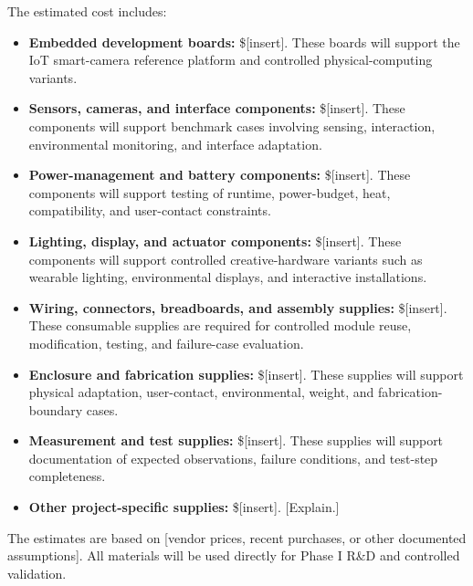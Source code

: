 \documentclass[11pt,letterpaper]{article}
\begin{document}
The estimated cost includes:

\begin{itemize}
    \item \textbf{Embedded development boards:} \$[insert].
    These boards will support the IoT smart-camera reference platform and
    controlled physical-computing variants.

    \item \textbf{Sensors, cameras, and interface components:} \$[insert].
    These components will support benchmark cases involving sensing,
    interaction, environmental monitoring, and interface adaptation.

    \item \textbf{Power-management and battery components:} \$[insert].
    These components will support testing of runtime, power-budget, heat,
    compatibility, and user-contact constraints.

    \item \textbf{Lighting, display, and actuator components:} \$[insert].
    These components will support controlled creative-hardware variants such
    as wearable lighting, environmental displays, and interactive
    installations.

    \item \textbf{Wiring, connectors, breadboards, and assembly supplies:}
    \$[insert].
    These consumable supplies are required for controlled module reuse,
    modification, testing, and failure-case evaluation.

    \item \textbf{Enclosure and fabrication supplies:} \$[insert].
    These supplies will support physical adaptation, user-contact,
    environmental, weight, and fabrication-boundary cases.

    \item \textbf{Measurement and test supplies:} \$[insert].
    These supplies will support documentation of expected observations,
    failure conditions, and test-step completeness.

    \item \textbf{Other project-specific supplies:} \$[insert].
    [Explain.]
\end{itemize}

The estimates are based on [vendor prices, recent purchases, or other
documented assumptions]. All materials will be used directly for Phase I R\&D
and controlled validation.

\end{document}
